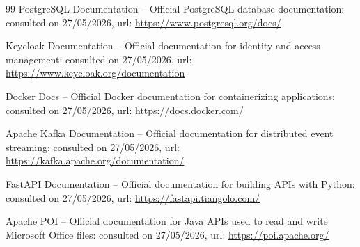 \begin{thebibliography}{99}
PostgreSQL Documentation -- Official PostgreSQL database documentation: consulted on 27/05/2026, url:
\url{https://www.postgresql.org/docs/}

Keycloak Documentation -- Official documentation for identity and access management: consulted on 27/05/2026, url:
\url{https://www.keycloak.org/documentation}

Docker Docs -- Official Docker documentation for containerizing applications: consulted on 27/05/2026, url:
\url{https://docs.docker.com/}

Apache Kafka Documentation -- Official documentation for distributed event streaming: consulted on 27/05/2026, url:
\url{https://kafka.apache.org/documentation/}

FastAPI Documentation -- Official documentation for building APIs with Python: consulted on 27/05/2026, url:
\url{https://fastapi.tiangolo.com/}

Apache POI -- Official documentation for Java APIs used to read and write Microsoft Office files: consulted on 27/05/2026, url:
\url{https://poi.apache.org/}

\end{thebibliography}

